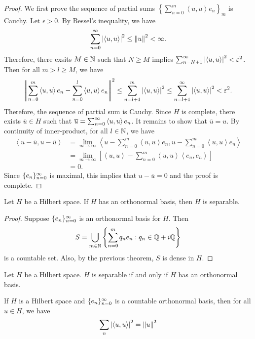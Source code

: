 \documentclass[a4paper]{article}
\renewcommand{\braket}[2]{\left\langle #1, #1 \right\rangle}
\begin{document}
\begin{proof}
We first prove the sequence of partial sums 
$\left\{ \sum_{n=0}^m \braket{u}{e_n} e_n \right\}_m$
is Cauchy. Let $\epsilon > 0$. By Bessel's inequality, 
we have 
\[
\suminfn \abs{\braket{u}{e_n}}^2 \leq \norm{u}^2 < \infty.
\]
Therefore, there exsits $M \in \mathbb{N}$ such that 
$N \geq M$ implies $\sum_{n=N+1}^\infty \abs{\braket{u}{e_n}}^2 
< \epsilon^2$. Then for all $m > l \geq M$, we have 
\[
\norm{\sum_{n=0}^m \braket{u}{e_n}e_n - 
\sum_{n=0}^l \braket{u}{e_n}e_n}^2 
\leq \sum_{n=l+1}^m \abs{\braket{u}{e_n}}^2 
\leq \sum_{n=l+1}^\infty \abs{\braket{u}{e_n}}^2 
< \epsilon^2.
\]
Therefore, the sequence of partial sum is Cauchy.
Since $H$ is complete, there exists $\bar{u} \in H$
such that $\bar{u} = \suminfn \braket{u}{e_n}e_n$. 
It remains to show that $\bar{u} = u$. 
By continuity of inner-product, for all $l \in \mathbb{N}$, we 
have 
\[
\begin{aligned}
  \braket{u - \bar{u}}{e_l} 
  &= \lim_{m \to \infty} \braket{u - \sum_{n=0}^m 
  \braket{u}{e_n} e_n}{e_l}  \\
  &= \lim_{m \to \infty} \left[ \braket{u}{e_l} 
  - \sum_{n=0}^m \braket{u}{e_n} \braket{e_n}{e_l} \right] \\
  &= 0.
\end{aligned}
\]
Since $\{ e_n \}_{n=0}^\infty$ is maximal, this implies that 
$u - \bar{u} = 0$ and the proof is complete.
\end{proof}

\begin{thm}
Let $H$ be a Hilbert space.
If $H$ has an orthonormal basis, then 
$H$ is separable.
\end{thm}

\begin{proof}
Suppose $\{ e_n \}_{n=0}^\infty$ is an orthonormal basis for $H$. 
Then 
\[
S = \bigcup_{m \in \mathbb{N}} \left\{ \sum_{n=0}^m q_n e_n : 
q_n \in \mathbb{Q} + i \mathbb{Q} \right\}
\]
is a countable set. 
Also, by the previous theorem, $S$ is dense in $H$.
\end{proof}

\begin{remark}
Let $H$ be a Hilbert space. $H$ is separable if and only if 
$H$ has an orthonormal basis.
\end{remark}

\begin{thm}
If $H$ is a Hilbert space and $\{ e_n \}_{n=0}^\infty$ is a
countable orthonormal basis, then for all $u \in H$, 
we have 
\[
\sum_n \abs{\braket{u}{e_n}}^2 = \norm{u}^2
\]
\end{thm}
\end{document}
